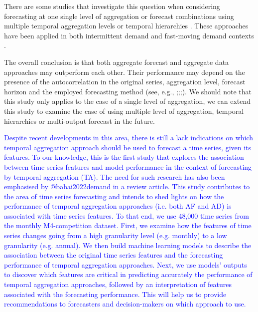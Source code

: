 \documentclass[preprint, 3p,
authoryear]{elsarticle} %
\begin{document}
There are some studies that investigate this question when considering
forecasting at one single level of aggregation
\citep{rostami2013demand, rostami2014note, kourentzes2017demand} or
forecast combinations using multiple temporal aggregation levels
\citep{kourentzes2014improving} or temporal hierarchies
\citep{athanasopoulos2017forecasting}. These approaches have been
applied \citep{nikolopoulos2011aggregate, petropoulos2014forecast} in
both intermittent demand \citep{nikolopoulos2021we} and fast-moving
demand contexts \citep{athanasopoulos2017forecasting}.

The overall conclusion is that both aggregate forecast and aggregate
data approaches may outperform each other. Their performance may depend
on the presence of the autocorrelation in the original series,
aggregation level, forecast horizon and the employed forecasting method
(see, e.g.,
\citet{boylan2016performance};\citet{rostami2022aggregate};\citet{rostami2014note};\citet{nikolopoulos2011aggregate}).
We should note that this study only applies to the case of a single
level of aggregation, we can extend this study to examine the case of
using multiple level of aggregation, temporal hierarchies or
multi-output forecast in the future.

\textcolor{blue}{Despite recent developments in this area, there is still a lack indications on which temporal aggregation approach should be used to forecast a time series, given its features. To our knowledge, this is the first study that explores the association between time series features and model performance in the context of forecasting by temporal aggregation (TA). The need for such research has also
been emphasised by @babai2022demand in a review article. This study contributes to the area of time series forecasting and intends to shed lights on how the performance of temporal aggregation approaches (i.e. both AF and AD) is associated with time series features. To that end, we use 48,000 time series from the monthly M4-competition dataset. First, we examine how the features of time series changes going from a high granularity level (e.g. monthly) to a low granularity (e.g. annual). We then build machine learning models to describe the association between the original time series features and the forecasting performance of temporal aggregation approaches. Next, we use models' outputs to discover which features are critical in predicting accurately the performance of temporal aggregation approaches, followed by an interpretation of features associated with the forecasting performance. This will help us to provide recommendations to forecasters and decision-makers on which approach to use.}
\end{document}
